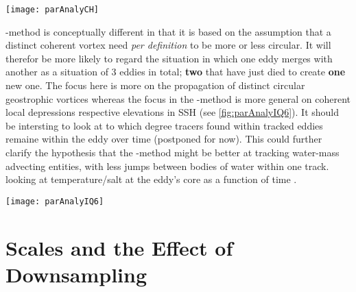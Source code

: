 \begin{figure*}
\texttt{[image: parAnalyCH]}
\caption{The \MI-method. Top: Consecutive contours of one track. Colors indicate percentage of change of contour's area with respect to the prior time-step. Topmost horizontal axis shows the (rounded) factor of $\scale$ with respect to the local first baroclinic $\Lr$. Vectors' lengths are proportional to the distance travelled with respect to the next time-step. Bottom: Blue graph shows the current $\IQ$. Bars show the factors of change of respective parameters with respect to the prior time-step. X-axis are days since birth.}
\label{fig:parAnalyCH}
\end{figure*}

 \MII-method is conceptually different in that it is based on the assumption that a distinct coherent vortex need \textit{per definition} to be more or less circular. It will therefor be more likely to regard \eg the situation in which one eddy merges with another as a situation of 3 eddies in total; \textbf{two} that have just died to create \textbf{one} new one.
The focus here is more on the propagation of distinct circular geostrophic vortices whereas the focus in the \MI-method is more general on coherent local depressions respective elevations in SSH (see \cref{fig:parAnalyIQ6}).
It should be intersting to look at to which degree tracers found within tracked eddies remaine within the eddy over time (postponed for now). This could further clarify the hypothesis that the \MI-method might be better at tracking water-mass advecting entities, with less jumps between bodies of water within one track. \Eg looking at temperature/salt at the eddy's core as a function of time .

\begin{figure*}
\texttt{[image: parAnalyIQ6]}
\caption{The \MII-method ($\IQ$-threshold at $0.6$). (see \cref{fig:parAnalyCH})}
\label{fig:parAnalyIQ6}
\end{figure*}





\section{Scales and the Effect of Downsampling}

